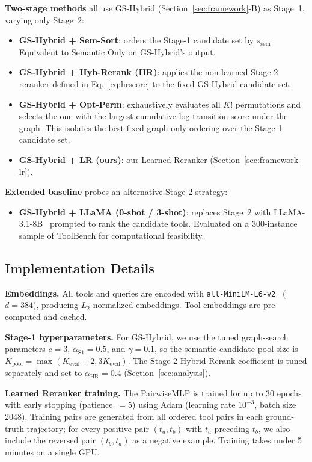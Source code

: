 \documentclass[lettersize,journal]{IEEEtran}
\begin{document}
\textbf{Two-stage methods} all use GS-Hybrid (Section~\ref{sec:framework}-B) as Stage~1, varying only Stage~2:
\begin{itemize}
    \item \textbf{GS-Hybrid + Sem-Sort}: orders the Stage-1 candidate set by $s_{\text{sem}}$. Equivalent to Semantic Only on GS-Hybrid's output.
    \item \textbf{GS-Hybrid + Hyb-Rerank (HR)}: applies the non-learned Stage-2 reranker defined in Eq.~\eqref{eq:hrscore} to the fixed GS-Hybrid candidate set.
    \item \textbf{GS-Hybrid + Opt-Perm}: exhaustively evaluates all $K!$ permutations and selects the one with the largest cumulative log transition score under the graph. This isolates the best fixed graph-only ordering over the Stage-1 candidate set.
    \item \textbf{GS-Hybrid + LR (ours)}: our Learned Reranker (Section~\ref{sec:framework-lr}).
\end{itemize}

\textbf{Extended baseline} probes an alternative Stage-2 strategy:
\begin{itemize}
    \item \textbf{GS-Hybrid + LLaMA (0-shot / 3-shot)}: replaces Stage~2 with LLaMA-3.1-8B~\cite{llama3} prompted to rank the candidate tools. Evaluated on a 300-instance sample of ToolBench for computational feasibility.
\end{itemize}

\subsection{Implementation Details}

\textbf{Embeddings.}
All tools and queries are encoded with \texttt{all-MiniLM-L6-v2}~\cite{sentencetransformers} ($d = 384$), producing $L_2$-normalized embeddings. Tool embeddings are pre-computed and cached.

\textbf{Stage-1 hyperparameters.}
For GS-Hybrid, we use the tuned graph-search parameters $c = 3$, $\alpha_{\text{S1}} = 0.5$, and $\gamma = 0.1$, so the semantic candidate pool size is $K_{\text{pool}} = \max(K_{\mathrm{eval}} + 2, 3K_{\mathrm{eval}})$.
The Stage-2 Hybrid-Rerank coefficient is tuned separately and set to $\alpha_{\text{HR}} = 0.4$ (Section~\ref{sec:analysis}).

\textbf{Learned Reranker training.}
The PairwiseMLP is trained for up to 30 epochs with early stopping (patience~$= 5$) using Adam (learning rate $10^{-3}$, batch size 2048).
Training pairs are generated from all ordered tool pairs in each ground-truth trajectory; for every positive pair $(t_a, t_b)$ with $t_a$ preceding $t_b$, we also include the reversed pair $(t_b, t_a)$ as a negative example.
Training takes under 5 minutes on a single GPU.
\end{document}
